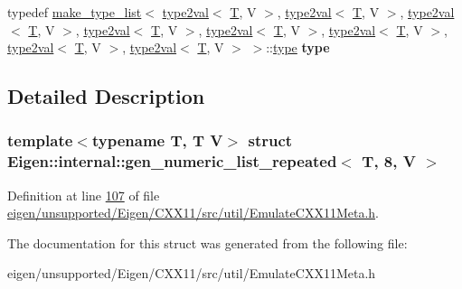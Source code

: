 \begin{DoxyCompactItemize}
typedef \hyperlink{struct_eigen_1_1internal_1_1make__type__list}{make\+\_\+type\+\_\+list}$<$ \hyperlink{struct_eigen_1_1internal_1_1type2val}{type2val}$<$ \hyperlink{group___sparse_core___module}{T}, V $>$, \hyperlink{struct_eigen_1_1internal_1_1type2val}{type2val}$<$ \hyperlink{group___sparse_core___module}{T}, V $>$, \hyperlink{struct_eigen_1_1internal_1_1type2val}{type2val}$<$ \hyperlink{group___sparse_core___module}{T}, V $>$, \hyperlink{struct_eigen_1_1internal_1_1type2val}{type2val}$<$ \hyperlink{group___sparse_core___module}{T}, V $>$, \hyperlink{struct_eigen_1_1internal_1_1type2val}{type2val}$<$ \hyperlink{group___sparse_core___module}{T}, V $>$, \hyperlink{struct_eigen_1_1internal_1_1type2val}{type2val}$<$ \hyperlink{group___sparse_core___module}{T}, V $>$, \hyperlink{struct_eigen_1_1internal_1_1type2val}{type2val}$<$ \hyperlink{group___sparse_core___module}{T}, V $>$, \hyperlink{struct_eigen_1_1internal_1_1type2val}{type2val}$<$ \hyperlink{group___sparse_core___module}{T}, V $>$ $>$\+::\hyperlink{struct_eigen_1_1internal_1_1type__list}{type} {\bfseries type}
\end{DoxyCompactItemize}


\subsection{Detailed Description}
\subsubsection*{template$<$typename T, T V$>$\newline
struct Eigen\+::internal\+::gen\+\_\+numeric\+\_\+list\+\_\+repeated$<$ T, 8, V $>$}



Definition at line \hyperlink{eigen_2unsupported_2_eigen_2_c_x_x11_2src_2util_2_emulate_c_x_x11_meta_8h_source_l00107}{107} of file \hyperlink{eigen_2unsupported_2_eigen_2_c_x_x11_2src_2util_2_emulate_c_x_x11_meta_8h_source}{eigen/unsupported/\+Eigen/\+C\+X\+X11/src/util/\+Emulate\+C\+X\+X11\+Meta.\+h}.



The documentation for this struct was generated from the following file\+:\begin{DoxyCompactItemize}
\item 
eigen/unsupported/\+Eigen/\+C\+X\+X11/src/util/\+Emulate\+C\+X\+X11\+Meta.\+h\end{DoxyCompactItemize}
